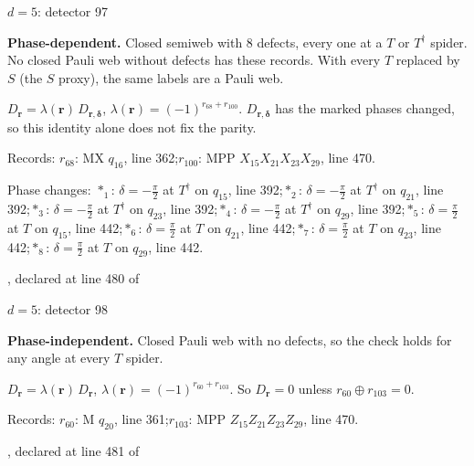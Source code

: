\label{d5_det097}
{\Large $d=5$: detector 97}\par
\textbf{Phase-dependent.} Closed semiweb with 8 defects, every one at a $T$ or $T^\dagger$ spider. No closed Pauli web without defects has these records. With every $T$ replaced by $S$ (the $S$ proxy), the same labels are a Pauli web.
\begin{center}
\end{center}
\vspace{-1mm}
$D_{\boldsymbol r}=\lambda(\boldsymbol r)\,D_{\boldsymbol r,\boldsymbol\delta}$, \quad $\lambda(\boldsymbol r)=(-1)^{r_{68}+r_{100}}$. \qquad $D_{\boldsymbol r,\boldsymbol\delta}$ has the marked phases changed, so this identity alone does not fix the parity.
\par\smallskip\begin{minipage}{.98\linewidth}\small Records: $r_{68}$: MX $q_{16}$, line 362;\quad $r_{100}$: MPP $X_{15}X_{21}X_{23}X_{29}$, line 470.\end{minipage}
\par\smallskip\begin{minipage}{.98\linewidth}\small Phase changes: $\ast_{1}$: $\delta=-\frac{\pi}{2}$ at $T^\dagger$ on $q_{15}$, line 392;\quad $\ast_{2}$: $\delta=-\frac{\pi}{2}$ at $T^\dagger$ on $q_{21}$, line 392;\quad $\ast_{3}$: $\delta=-\frac{\pi}{2}$ at $T^\dagger$ on $q_{23}$, line 392;\quad $\ast_{4}$: $\delta=-\frac{\pi}{2}$ at $T^\dagger$ on $q_{29}$, line 392;\quad $\ast_{5}$: $\delta=\frac{\pi}{2}$ at $T$ on $q_{15}$, line 442;\quad $\ast_{6}$: $\delta=\frac{\pi}{2}$ at $T$ on $q_{21}$, line 442;\quad $\ast_{7}$: $\delta=\frac{\pi}{2}$ at $T$ on $q_{23}$, line 442;\quad $\ast_{8}$: $\delta=\frac{\pi}{2}$ at $T$ on $q_{29}$, line 442.\end{minipage}
\vfill
{\footnotesize\texttt{}, declared at line 480 of \texttt{}}
\newpage

\label{d5_det098}
{\Large $d=5$: detector 98}\par
\textbf{Phase-independent.} Closed Pauli web with no defects, so the check holds for any angle at every $T$ spider.
\begin{center}
\end{center}
\vspace{-1mm}
$D_{\boldsymbol r}=\lambda(\boldsymbol r)\,D_{\boldsymbol r}$, \quad $\lambda(\boldsymbol r)=(-1)^{r_{60}+r_{103}}$. \qquad So $D_{\boldsymbol r}=0$ unless $r_{60}\oplus r_{103}=0$.
\par\smallskip\begin{minipage}{.98\linewidth}\small Records: $r_{60}$: M $q_{20}$, line 361;\quad $r_{103}$: MPP $Z_{15}Z_{21}Z_{23}Z_{29}$, line 470.\end{minipage}
\vfill
{\footnotesize\texttt{}, declared at line 481 of \texttt{}}
\newpage

